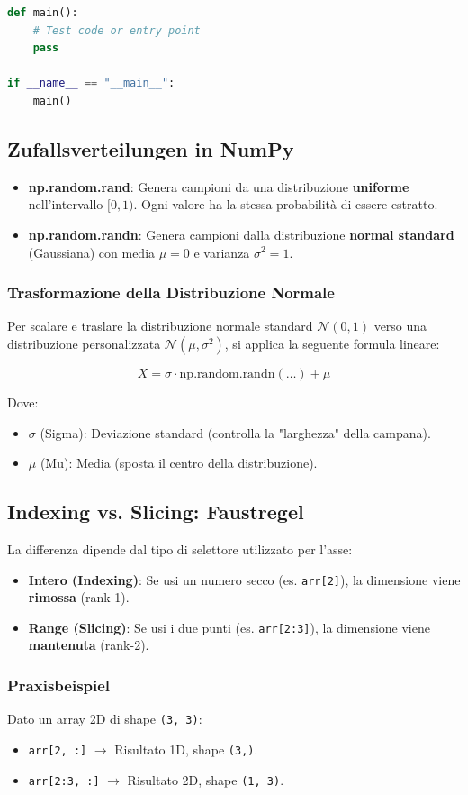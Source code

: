 \begin{lstlisting}[language=Python]
def main():
    # Test code or entry point
    pass

if __name__ == "__main__":
    main()
\end{lstlisting}

\subsection{Zufallsverteilungen in NumPy}
\begin{itemize}
    \item \textbf{np.random.rand}: Genera campioni da una distribuzione \textbf{uniforme} nell'intervallo $[0, 1)$. Ogni valore ha la stessa probabilità di essere estratto.
    \item \textbf{np.random.randn}: Genera campioni dalla distribuzione \textbf{normal standard} (Gaussiana) con media $\mu = 0$ e varianza $\sigma^2 = 1$.
\end{itemize}

\subsubsection{Trasformazione della Distribuzione Normale}
Per scalare e traslare la distribuzione normale standard $\mathcal{N}(0, 1)$ verso una distribuzione personalizzata $\mathcal{N}(\mu, \sigma^2)$, si applica la seguente formula lineare:

\[ X = \sigma \cdot \text{np.random.randn}(\dots) + \mu \]

Dove:
\begin{itemize}
    \item $\sigma$ (Sigma): Deviazione standard (controlla la "larghezza" della campana).
    \item $\mu$ (Mu): Media (sposta il centro della distribuzione).
\end{itemize}

\subsection{Indexing vs. Slicing: Faustregel}
La differenza dipende dal tipo di selettore utilizzato per l'asse:

\begin{itemize}
    \item \textbf{Intero (Indexing)}: Se usi un numero secco (es. \texttt{arr[2]}), la dimensione viene \textbf{rimossa} (rank-1).
    \item \textbf{Range (Slicing)}: Se usi i due punti (es. \texttt{arr[2:3]}), la dimensione viene \textbf{mantenuta} (rank-2).
\end{itemize}

\subsubsection{Praxisbeispiel}Dato un array 2D di shape \texttt{(3, 3)}:
\begin{itemize}
    \item \texttt{arr[2, :]} $\rightarrow$ Risultato 1D, shape \texttt{(3,)}.
    \item \texttt{arr[2:3, :]} $\rightarrow$ Risultato 2D, shape \texttt{(1, 3)}.
\end{itemize}